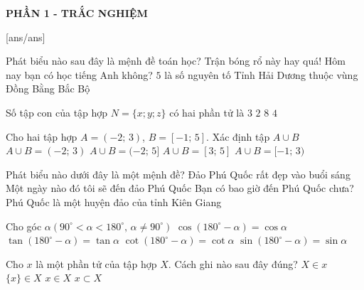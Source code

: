  
\begin{center}
	\textbf{PHẦN 1 - TRẮC NGHIỆM}
\end{center}
[ans/ans]
\begin{ex} %
	Phát biểu nào sau đây là mệnh đề toán học?
	\choice 
	{Trận bóng rổ này hay quá!}
	{Hôm nay bạn có học tiếng Anh không?}
	{\True $5$ là số nguyên tố}
	{Tỉnh Hải Dương thuộc vùng Đồng Bằng Bắc Bộ}
\end{ex} 
\begin{ex}%
	Số tập con của tập hợp $N=\{x ; y ; z \}$ có hai phần tử là 
	\choice
	{$3$}
	{$2$}
	{$8$}
	{\True $4$}
\end{ex}
\begin{ex}%
	Cho hai tập hợp $A=(-2;\,3)$, $B=[-1;\,5]$. Xác định tập $A\cup B$
	\choice
	{$A\cup B = (-2;\,3)$}
	{\True $A\cup B = (-2;\,5]$}
	{$A\cup B = [3;\,5]$}
	{$A\cup B = [-1;\,3)$}
	\loigiai{
		Ta có $A\cup B = (-2;\,5]$.
	}
\end{ex}
\begin{ex}%
	Phát biểu nào dưới đây là một mệnh đề?
	\choice 
	{Đảo Phú Quốc rất đẹp vào buổi sáng} 
	{Một ngày nào đó tôi sẽ đến đảo Phú Quốc} 
	{Bạn có bao giờ đến Phú Quốc chưa?}
	{\True Phú Quốc là một huyện đảo của tỉnh Kiên Giang}
\end{ex}
\begin{ex} %
	Cho góc $\alpha\left(90^\circ <\alpha<180^\circ,\,\alpha \ne 90^\circ \right )$
	\choice 
	{$\cos\left(180^{\circ} -\alpha \right )=\cos\alpha$} 
	{$\tan\left(180^{\circ} -\alpha \right )=\tan\alpha$} 
	{$\cot\left(180^{\circ} -\alpha \right )=\cot\alpha$} 
	{\True $\sin\left(180^{\circ} -\alpha \right )=\sin\alpha$} 
\end{ex}
\begin{ex}%
	Cho $x$ là một phần tử của tập hợp $X$. Cách ghi nào sau đây đúng?
	\choice
	{$X\in x$}
	{$\{x\}\in X$}
	{\True $x\in X$}
	{$x\subset X$}
\end{ex}
